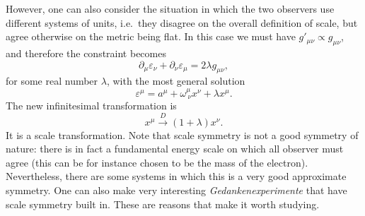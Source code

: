 \documentclass[a4paper,12pt]{article}
\numberwithin{equation}{section}
\begin{document}
However, one can also consider the situation in which the two observers use different systems of units, i.e.~they disagree on the overall definition of scale, but agree otherwise on the metric being flat.
In this case we must have $g'_{\mu\nu} \propto g_{\mu\nu}$, and therefore the constraint becomes
\begin{equation}
	\partial_\mu \varepsilon_\nu
	+ \partial_\nu \varepsilon_\mu = 2 \lambda g_{\mu\nu},
\end{equation}
for some real number $\lambda$,
with the most general solution
\begin{equation}
	\varepsilon^\mu = a^\mu + \omega^\mu_{~\nu} x^\nu
	+ \lambda x^\mu.
\end{equation}
The new infinitesimal transformation is
\begin{equation}
	x^\mu \xrightarrow{D} (1 + \lambda) x^\nu.
\end{equation}
It is a scale transformation. Note that scale symmetry is not a good symmetry of nature: there is in fact a fundamental energy scale on which all observer must agree (this can be for instance chosen to be the mass of the electron).
Nevertheless, there are some systems in which this is a very good approximate symmetry. One can also make very interesting \emph{Gedankenexperimente} that have scale symmetry built in. These are reasons that make it worth studying.
\end{document}
